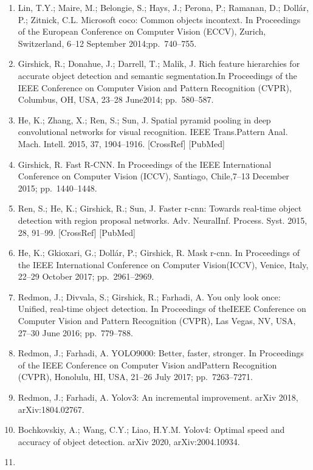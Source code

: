 \documentclass[
  10
]{article}
\begin{document}
\begin{enumerate}
  ofthe IEEE Conference on Computer Vision and Pattern Recognition
  (CVPR), Miami, FL, USA, 20--25 June 2009; pp.~248--255.
\item
  Lin, T.Y.; Maire, M.; Belongie, S.; Hays, J.; Perona, P.; Ramanan, D.;
  Dollár, P.; Zitnick, C.L. Microsoft coco: Common objects incontext. In
  Proceedings of the European Conference on Computer Vision (ECCV),
  Zurich, Switzerland, 6--12 September 2014;pp.~740--755.
\item
  Girshick, R.; Donahue, J.; Darrell, T.; Malik, J. Rich feature
  hierarchies for accurate object detection and semantic segmentation.In
  Proceedings of the IEEE Conference on Computer Vision and Pattern
  Recognition (CVPR), Columbus, OH, USA, 23--28 June2014; pp.~580--587.
\item
  He, K.; Zhang, X.; Ren, S.; Sun, J. Spatial pyramid pooling in deep
  convolutional networks for visual recognition. IEEE Trans.Pattern
  Anal. Mach. Intell. 2015, 37, 1904--1916. {[}CrossRef{]} {[}PubMed{]}
\item
  Girshick, R. Fast R-CNN. In Proceedings of the IEEE International
  Conference on Computer Vision (ICCV), Santiago, Chile,7--13 December
  2015; pp.~1440--1448.
\item
  Ren, S.; He, K.; Girshick, R.; Sun, J. Faster r-cnn: Towards real-time
  object detection with region proposal networks. Adv. NeuralInf.
  Process. Syst. 2015, 28, 91--99. {[}CrossRef{]} {[}PubMed{]}
\item
  He, K.; Gkioxari, G.; Dollár, P.; Girshick, R. Mask r-cnn. In
  Proceedings of the IEEE International Conference on Computer
  Vision(ICCV), Venice, Italy, 22--29 October 2017; pp.~2961--2969.
\item
  Redmon, J.; Divvala, S.; Girshick, R.; Farhadi, A. You only look once:
  Unified, real-time object detection. In Proceedings of theIEEE
  Conference on Computer Vision and Pattern Recognition (CVPR), Las
  Vegas, NV, USA, 27--30 June 2016; pp.~779--788.
\item
  Redmon, J.; Farhadi, A. YOLO9000: Better, faster, stronger. In
  Proceedings of the IEEE Conference on Computer Vision andPattern
  Recognition (CVPR), Honolulu, HI, USA, 21--26 July 2017;
  pp.~7263--7271.
\item
  Redmon, J.; Farhadi, A. Yolov3: An incremental improvement. arXiv
  2018, arXiv:1804.02767.
\item
  Bochkovskiy, A.; Wang, C.Y.; Liao, H.Y.M. Yolov4: Optimal speed and
  accuracy of object detection. arXiv 2020, arXiv:2004.10934.
\item

\end{enumerate}
\end{document}
